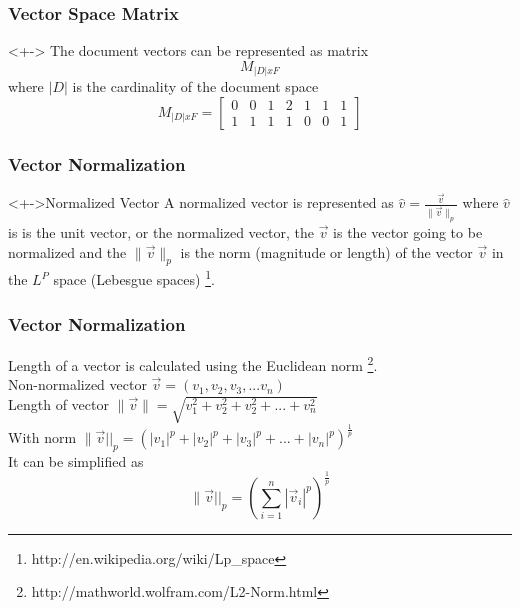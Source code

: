 \documentclass[serif,11pt,aspectratio=1610,table]{beamer}
\begin{document}
\begin{frame}[fragile]
 \frametitle{Vector Space Matrix}
\begin{block}<+->{}
 The document vectors can be represented as matrix
 \begin{displaymath}
  M_{|D|  x  F }
  \end{displaymath}
  where $|D|$ is the cardinality of the document space
  \begin{displaymath}
  M_{|D|   x  F }  = \begin{bmatrix}
                    0 & 0 & 1 & 2 & 1 & 1 & 1 \\

                    1 & 1 & 1 & 1 & 0 & 0 & 1
                   \end{bmatrix}
  \end{displaymath}
  \end{block}

\end{frame}

\begin{frame}[fragile]
 \frametitle{Vector Normalization}
 \begin{block}<+->{Normalized Vector}
  A normalized vector is represented as
   $\hat{v} = \frac{\vec{v}}{\|\vec{v}\|_p}$
where $\hat{v}$ is is the unit vector, or the normalized vector, the $\vec{v}$ is the vector going to be normalized and the $\|\vec{v}\|_p$ is the norm (magnitude or length) of the vector $\vec{v}$ in the $L^{P}$ space (Lebesgue spaces) \footnote{http://en.wikipedia.org/wiki/Lp\_space}.
 \end{block}

\end{frame}

\begin{frame}[fragile]
 \frametitle{Vector Normalization}
Length of a vector is calculated using the Euclidean norm \footnote{http://mathworld.wolfram.com/L2-Norm.html}. \\
Non-normalized vector  $\vec v = (v_{1},v_{2},v_{3},...v_{n}) $ \\ 
Length of vector $ \|\vec v \| = \sqrt {v_{1}^{2} + v_{2}^{2} + v_{2}^{2} + ... + v_{n}^{2}} $ \\ 
With norm $ \| \vec v || _{p} = (|v_{1}|^{p} + |v_{2}|^{p} + |v_{3}|^{p} + ... + |v_{n}|^{p})^\frac{1}{p} $ \\
It can be simplified as\\ 
\begin{displaymath}
 \| \vec v || _{p} = ( \sum_{i=1}^{n} |\vec v_{i}| ^{p}) ^{ \frac{1}{p}}
\end{displaymath}

\end{frame}
\end{document}
